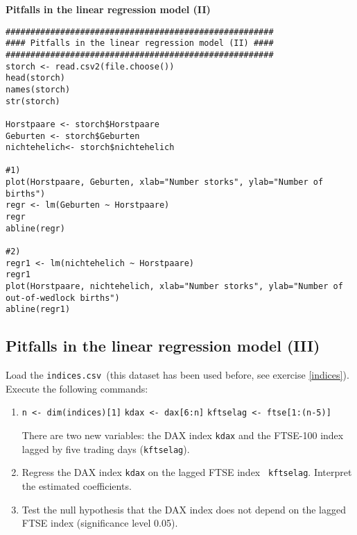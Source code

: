 \documentclass{article}
\begin{document}
\begin{solution}
\textbf{Pitfalls in the linear regression model (II)}

\begin{verbatim}
######################################################
#### Pitfalls in the linear regression model (II) ####
######################################################
storch <- read.csv2(file.choose())
head(storch)
names(storch)
str(storch)

Horstpaare <- storch$Horstpaare
Geburten <- storch$Geburten
nichtehelich<- storch$nichtehelich

#1)
plot(Horstpaare, Geburten, xlab="Number storks", ylab="Number of births")
regr <- lm(Geburten ~ Horstpaare)
regr
abline(regr)

#2)
regr1 <- lm(nichtehelich ~ Horstpaare)
regr1
plot(Horstpaare, nichtehelich, xlab="Number storks", ylab="Number of out-of-wedlock births")
abline(regr1)
\end{verbatim}
\end{solution}

\subsection{Pitfalls in the linear regression model (III)}

Load the \texttt{indices.csv }(this dataset has been used before, see
exercise \ref{indices}). Execute the following commands:\smallskip

\begin{enumerate}
\item \texttt{n <- dim(indices)[1]}\newline
\texttt{kdax <- dax[6:n]}\newline
\texttt{kftselag <- ftse[1:(n-5)]}

There are two new variables: the DAX index \texttt{kdax} and the FTSE-100
index lagged by five trading days (\texttt{kftselag}).

\item Regress the DAX index \texttt{kdax} on the lagged FTSE index \texttt{%
kftselag}. Interpret the estimated coefficients.

\item Test the null hypothesis that the DAX index does not depend on the
lagged FTSE index (significance level 0.05).
\end{enumerate}
\end{document}
